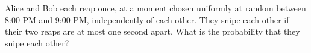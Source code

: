 Alice and Bob each reap once, at a moment chosen uniformly at random between 8:00 PM and 9:00 PM, independently of each other. They snipe each other if their two reaps are at most one second apart. What is the probability that they snipe each other?
